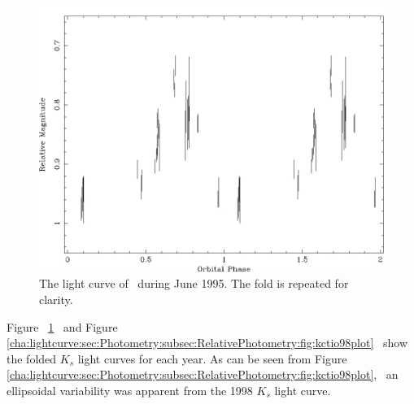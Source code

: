 \begin{figure}[!htb]
\begin{center}
\includegraphics[width=5.0in]{kctio95plot}
\caption{%
The light curve of \groj\ during June 1995.
The fold is repeated for clarity. %
}\label{cha:lightcurve:sec:Photometry:subsec:RelativePhotometry:fig:kctio95plot}
\end{center}
\end{figure}

\vspace{\myparskip}

Figure~%
\ref{cha:lightcurve:sec:Photometry:subsec:RelativePhotometry:fig:kctio95plot}%
\ and Figure~%
\ref{cha:lightcurve:sec:Photometry:subsec:RelativePhotometry:fig:kctio98plot}%
\ show the folded $K_s$ light curves for each year. As can be seen from Figure~%
\ref{cha:lightcurve:sec:Photometry:subsec:RelativePhotometry:fig:kctio98plot},%
\ an ellipsoidal variability was apparent from the 1998 $K_s$ light curve. %

